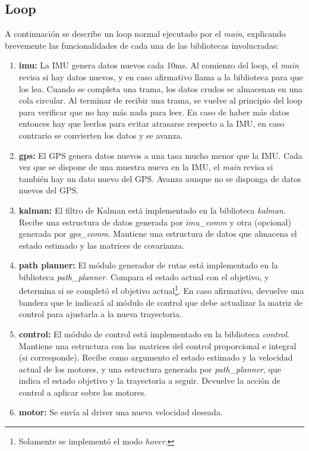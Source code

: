 \documentclass[main]{subfiles}
\begin{document}
\subsection{Loop}
\label{sec:software-loop}

A continuaci\'on se describe un loop normal ejecutado por el \textit{main}, explicando brevemente las funcionalidades de cada una de las bibliotecas involucradas:
\begin{enumerate}

\item \textbf{imu:} La IMU genera datos nuevos cada 10ms. Al comienzo del loop, el \textit{main} revisa si hay datos nuevos, y en caso afirmativo llama a la biblioteca para que los lea. Cuando se completa una trama, los datos crudos se almacenan en una cola circular. Al terminar de recibir una trama, se vuelve al principio del loop para verificar que no hay m\'as nada para leer. En caso de haber m\'as datos entonces hay que leerlos para evitar atrasarse respecto a la IMU, en caso contrario se convierten los datos y se avanza.

\item \textbf{gps:} El GPS genera datos nuevos a una tasa mucho menor que la IMU. Cada vez que se dispone de una muestra nueva en la IMU, el \textit{main} revisa si tambi\'en hay un dato nuevo del GPS. Avanza aunque no se disponga de datos nuevos del GPS.

\item \textbf{kalman:} El filtro de Kalman est\'a implementado en la biblioteca \textit{kalman}. Recibe una estructura de datos generada por \textit{imu\_comm} y otra (opcional) generada por \textit{gps\_comm}. Mantiene una estructura de datos que almacena el estado estimado y las matrices de covarianza.

\item \textbf{path planner:} El m\'odulo generador de rutas est\'a implementado en la biblioteca \textit{path\_planner}. Compara el estado actual con el objetivo, y determina si se completó el objetivo actual\footnote{Solamente se implement\'o el modo \textit{hover}.}. En caso afirmativo, devuelve una bandera que le indicar\'a al m\'odulo de control que debe actualizar la matriz de control para ajustarla a la nueva trayectoria.

\item \textbf{control:} El m\'odulo de control est\'a implementado en la biblioteca \textit{control}. Mantiene una estructura con las matrices del control proporcional e integral (si corresponde). Recibe como argumento el estado estimado y la velocidad actual de los motores, y una estructura generada por \textit{path\_planner}, que indica el estado objetivo y la trayectoria a seguir. Devuelve la acci\'on de control a aplicar sobre los motores.

\item \textbf{motor:} Se env\'ia al driver una nueva velocidad deseada.

\end{enumerate}
\end{document}
